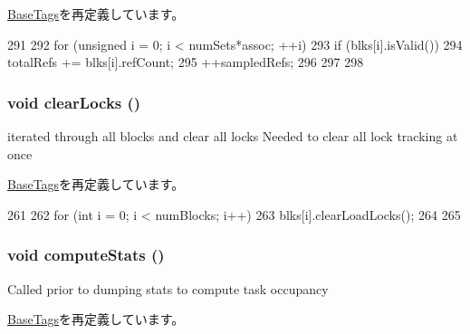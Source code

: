 \hyperlink{classBaseTags_aab539ffaf653a007b5326b2042dc8e86}{BaseTags}を再定義しています。


\begin{DoxyCode}
291 {
292     for (unsigned i = 0; i < numSets*assoc; ++i) {
293         if (blks[i].isValid()) {
294             totalRefs += blks[i].refCount;
295             ++sampledRefs;
296         }
297     }
298 }
\end{DoxyCode}
\hypertarget{classLRU_a522e7dda9c2f4eba2cc1c103887d9265}{
\subsubsection[{clearLocks}]{\setlength{\rightskip}{0pt plus 5cm}void clearLocks ()}}
\label{classLRU_a522e7dda9c2f4eba2cc1c103887d9265}
iterated through all blocks and clear all locks Needed to clear all lock tracking at once 

\hyperlink{classBaseTags_a9f3e3b80f263780be72db8b9dc53680e}{BaseTags}を再定義しています。


\begin{DoxyCode}
261 {
262     for (int i = 0; i < numBlocks; i++){
263         blks[i].clearLoadLocks();
264     }
265 }
\end{DoxyCode}
\hypertarget{classLRU_a7dd045727ced6181c74934442e2ca33d}{
\subsubsection[{computeStats}]{\setlength{\rightskip}{0pt plus 5cm}void computeStats ()}}
\label{classLRU_a7dd045727ced6181c74934442e2ca33d}
Called prior to dumping stats to compute task occupancy 

\hyperlink{classBaseTags_a23fd48fae3a5efe5e8ffbefb54e51c1c}{BaseTags}を再定義しています。


